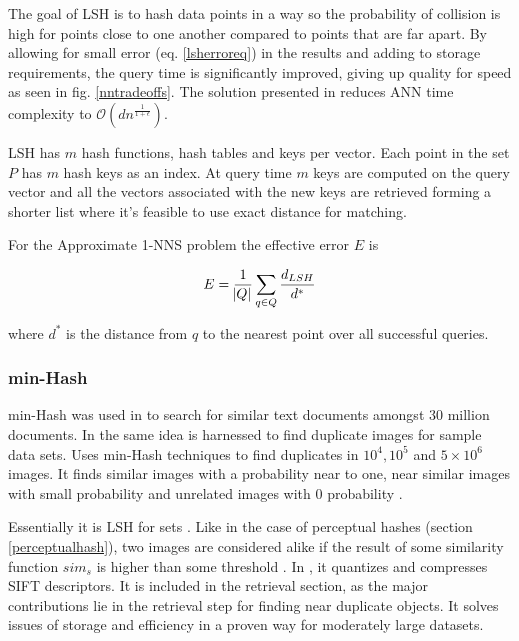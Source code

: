 \documentclass[english,12pt,a4paper,pdftex,elec,utf8]{aaltothesis}
\begin{document}
The goal of LSH is to hash data points in a way so the probability of collision is high for points close to one another compared to points that are far apart. By allowing for small error (eq. \ref{lsherroreq}) in the results and adding to storage requirements, the query time is significantly improved, giving up quality for speed as seen in fig. \ref{nntradeoffs}. \cite{Gionis1999} The solution presented in \cite{Gionis1999} reduces ANN time complexity to $\mathcal{O}(dn^{\frac{1}{1+\epsilon}})$.

LSH has $m$ hash functions, hash tables and keys per vector. Each point in the set $P$ has $m$ hash keys as an index. At query time $m$ keys are computed on the query vector and all the vectors associated with the new keys are retrieved forming a shorter list where it's feasible to use exact distance for matching.





For the Approximate 1-NNS problem the effective error $E$ is

\begin{equation}
  \label{lsherroreq}
E = \frac{1}{\abs{Q}}\sum_{q\in Q}\frac{d_{LSH}}{d^*}
  \end{equation}

where $d^*$ is the distance from $q$ to the nearest point over all successful queries.


\subsubsection{min-Hash}
min-Hash was used in \cite{Broder1997} to search for similar text documents amongst 30 million documents. In \cite{Chum2008} the same idea is harnessed to find duplicate images for sample data sets. \cite{Chum2010} Uses min-Hash techniques to find duplicates in $10^4, 10^5$ and $5 \times 10^6$ images. It finds similar images with a probability near to one, near similar images with small probability and unrelated images with 0 probability \cite{Chum2010}.

Essentially it is LSH for sets \cite{Chum2010}. Like in the case of perceptual hashes (section \ref{perceptualhash}), two images are considered alike if the result of some similarity function $sim_s$ is higher than some threshold \cite{Chum2008}. In \cite{Chum2008}, it quantizes and compresses SIFT descriptors. It is included in the retrieval section, as the major contributions lie in the retrieval step for finding near duplicate objects. It solves issues of storage and efficiency in a proven way for moderately large datasets.
\end{document}
